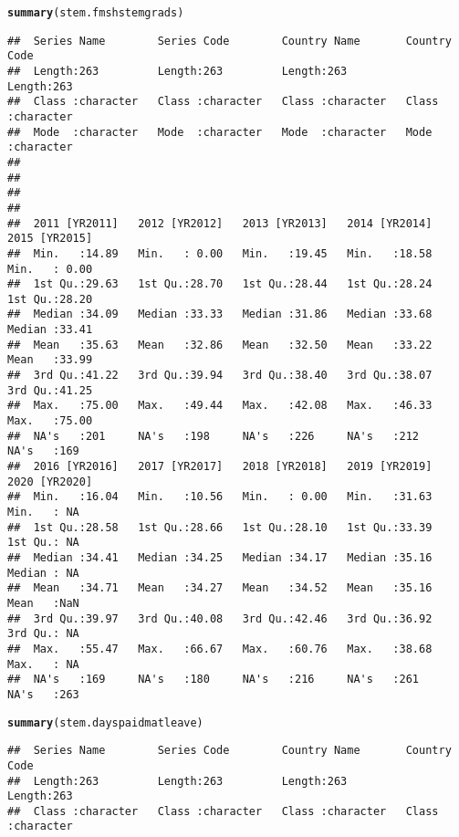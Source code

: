 \documentclass{article}\usepackage[]{graphicx}\usepackage[]{xcolor}
\makeatletter
\newcommand{\hldef}[1]{\textcolor[rgb]{0.345,0.345,0.345}{#1}}%
\newcommand{\hlkwd}[1]{\textcolor[rgb]{0.737,0.353,0.396}{\textbf{#1}}}%
\newenvironment{kframe}{%
 \def\at@end@of@kframe{}%
 \ifinner\ifhmode%
  \def\at@end@of@kframe{\end{minipage}}%
  \begin{minipage}{\columnwidth}%
 \fi\fi%
 \def\FrameCommand##1{\hskip\@totalleftmargin \hskip-\fboxsep
 \colorbox{shadecolor}{##1}\hskip-\fboxsep
     \hskip-\linewidth \hskip-\@totalleftmargin \hskip\columnwidth}%
 \MakeFramed {\advance\hsize-\width
   \@totalleftmargin\z@ \linewidth\hsize
   \@setminipage}}%
 {\par\unskip\endMakeFramed%
 \at@end@of@kframe}
\newenvironment{knitrout}{}{} %
\makeatother
\begin{document}
\begin{knitrout}
\begin{kframe}
\begin{alltt}
  \hlkwd{summary}\hldef{(stem.fmshstemgrads)}
\end{alltt}
\begin{verbatim}
##  Series Name        Series Code        Country Name       Country Code      
##  Length:263         Length:263         Length:263         Length:263        
##  Class :character   Class :character   Class :character   Class :character  
##  Mode  :character   Mode  :character   Mode  :character   Mode  :character  
##                                                                             
##                                                                             
##                                                                             
##                                                                             
##  2011 [YR2011]   2012 [YR2012]   2013 [YR2013]   2014 [YR2014]   2015 [YR2015]  
##  Min.   :14.89   Min.   : 0.00   Min.   :19.45   Min.   :18.58   Min.   : 0.00  
##  1st Qu.:29.63   1st Qu.:28.70   1st Qu.:28.44   1st Qu.:28.24   1st Qu.:28.20  
##  Median :34.09   Median :33.33   Median :31.86   Median :33.68   Median :33.41  
##  Mean   :35.63   Mean   :32.86   Mean   :32.50   Mean   :33.22   Mean   :33.99  
##  3rd Qu.:41.22   3rd Qu.:39.94   3rd Qu.:38.40   3rd Qu.:38.07   3rd Qu.:41.25  
##  Max.   :75.00   Max.   :49.44   Max.   :42.08   Max.   :46.33   Max.   :75.00  
##  NA's   :201     NA's   :198     NA's   :226     NA's   :212     NA's   :169    
##  2016 [YR2016]   2017 [YR2017]   2018 [YR2018]   2019 [YR2019]   2020 [YR2020]
##  Min.   :16.04   Min.   :10.56   Min.   : 0.00   Min.   :31.63   Min.   : NA  
##  1st Qu.:28.58   1st Qu.:28.66   1st Qu.:28.10   1st Qu.:33.39   1st Qu.: NA  
##  Median :34.41   Median :34.25   Median :34.17   Median :35.16   Median : NA  
##  Mean   :34.71   Mean   :34.27   Mean   :34.52   Mean   :35.16   Mean   :NaN  
##  3rd Qu.:39.97   3rd Qu.:40.08   3rd Qu.:42.46   3rd Qu.:36.92   3rd Qu.: NA  
##  Max.   :55.47   Max.   :66.67   Max.   :60.76   Max.   :38.68   Max.   : NA  
##  NA's   :169     NA's   :180     NA's   :216     NA's   :261     NA's   :263
\end{verbatim}
\begin{alltt}
  \hlkwd{summary}\hldef{(stem.dayspaidmatleave)}
\end{alltt}
\begin{verbatim}
##  Series Name        Series Code        Country Name       Country Code      
##  Length:263         Length:263         Length:263         Length:263        
##  Class :character   Class :character   Class :character   Class :character  

\end{verbatim}
\end{kframe}
\end{knitrout}
\end{document}
